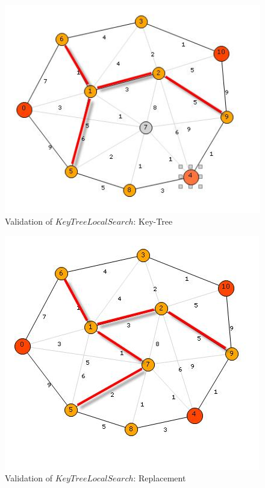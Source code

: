 \begin{figure}[H]
\begin{center}
\includegraphics[scale=0.9]{21.jpg}
\caption{Validation of $KeyTreeLocalSearch$: Key-Tree}\label{fig:21}
\end{center} 
\end{figure}

\begin{figure}[H]
\begin{center}
\includegraphics[scale=0.9]{22.jpg}
\caption{Validation of $KeyTreeLocalSearch$: Replacement}\label{fig:22}
\end{center} 
\end{figure}


